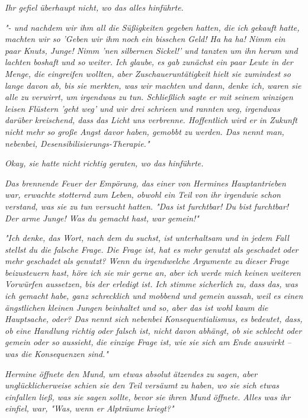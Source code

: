{\emph{Ihr gefiel überhaupt nicht, wo das alles hinführte.}

\emph{"- und nachdem wir ihm all die Süßigkeiten gegeben hatten, die ich} \emph{gekauft hatte, machten wir so 'Geben wir ihm noch ein bisschen Geld! Ha ha ha! Nimm ein paar Knuts, Junge! Nimm 'nen silbernen Sickel!' und tanzten um ihn herum und lachten boshaft und so weiter. Ich glaube, es gab zunächst ein paar Leute in der Menge, die eingreifen wollten, aber Zuschaueruntätigkeit hielt sie zumindest so lange davon ab, bis sie merkten, was wir machten und dann, denke ich, waren sie alle zu verwirrt, um irgendwas zu tun. Schließlich sagte er mit seinem winzigen leisen Flüstern 'geht weg' und wir drei schrieen und rannten weg, irgendwas darüber kreischend, dass das Licht uns verbrenne. Hoffentlich wird er in Zukunft nicht mehr so große Angst davor haben, gemobbt zu werden. Das nennt man, nebenbei, Desensibilisierungs-Therapie."}

\emph{Okay, sie hatte} \emph{\emph{nicht}} \emph{richtig geraten, wo das hinführte.}

\emph{Das brennende Feuer der Empörung, das einer von Hermines Hauptantrieben war, erwachte stotternd zum Leben, obwohl ein Teil von ihr irgendwie} \emph{\emph{schon}} \emph{verstand, was sie zu tun versucht hatten. "Das ist furchtbar!} \emph{\emph{Du bist}} \emph{furchtbar! Der arme Junge! Was du gemacht hast, war} \emph{\emph{gemein!}"}

\emph{"Ich denke, das Wort, nach dem du suchst, ist} \emph{\emph{unterhaltsam}} \emph{und in jedem Fall stellst du die falsche Frage. Die Frage ist, hat es mehr genutzt als geschadet oder mehr geschadet als genutzt? Wenn du irgendwelche Argumente zu} \emph{\emph{dieser}} \emph{Frage beizusteuern hast, höre ich sie mir gerne an, aber ich werde mich keinen weiteren Vorwürfen aussetzen, bis der erledigt ist. Ich stimme sicherlich zu, dass das, was ich gemacht habe, ganz schrecklich und mobbend und gemein} \emph{\emph{aussah,}} \emph{weil es einen ängstlichen kleinen Jungen beinhaltet und so, aber das ist wohl kaum die Hauptsache, oder? Das nennt sich nebenbei} \emph{\emph{Konsequentialismus,}} \emph{es bedeutet, dass, ob eine Handlung richtig oder falsch ist, nicht davon abhängt, ob sie schlecht oder gemein oder so} \emph{\emph{aussieht,}} \emph{die einzige Frage ist, wie sie sich am Ende auswirkt -- was die Konsequenzen sind."}

\emph{Hermine öffnete den Mund, um etwas absolut} \emph{\emph{ätzendes}} \emph{zu sagen, aber unglücklicherweise schien sie den Teil versäumt zu haben, wo sie sich etwas einfallen ließ, was sie sagen sollte, bevor sie ihren Mund öffnete. Alles was ihr einfiel, war, "Was, wenn er} \emph{\emph{Alpträume}} \emph{kriegt?"}

}

